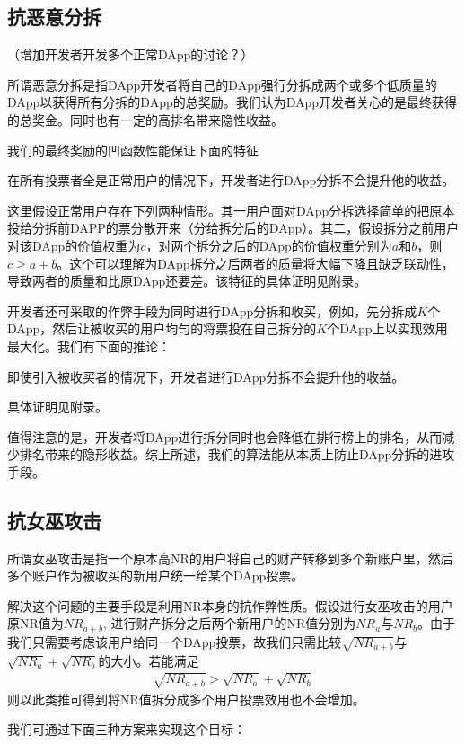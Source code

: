 \subsection{抗恶意分拆}
（增加开发者开发多个正常DApp的讨论？）

所谓恶意分拆是指DApp开发者将自己的DApp强行分拆成两个或多个低质量的DApp以获得所有分拆的DApp的总奖励。我们认为DApp开发者关心的是最终获得的总奖金。同时也有一定的高排名带来隐性收益。

我们的最终奖励的凹函数性能保证下面的特征
\begin{property}
	在所有投票者全是正常用户的情况下，开发者进行DApp分拆不会提升他的收益。
\end{property}
这里假设正常用户存在下列两种情形。其一用户面对DApp分拆选择简单的把原本投给分拆前DAPP的票分散开来（分给拆分后的DApp）。其二，假设拆分之前用户对该DApp的价值权重为$c$，对两个拆分之后的DApp的价值权重分别为$a$和$b$，则$c \geq a+b$。这个可以理解为DApp拆分之后两者的质量将大幅下降且缺乏联动性，导致两者的质量和比原DApp还要差。该特征的具体证明见附录。

开发者还可采取的作弊手段为同时进行DApp分拆和收买，例如，先分拆成$K$个DApp，然后让被收买的用户均匀的将票投在自己拆分的$K$个DApp上以实现效用最大化。我们有下面的推论：
\begin{corollary}
	即使引入被收买者的情况下，开发者进行DApp分拆不会提升他的收益。
\end{corollary}
具体证明见附录。

值得注意的是，开发者将DApp进行拆分同时也会降低在排行榜上的排名，从而减少排名带来的隐形收益。综上所述，我们的算法能从本质上防止DApp分拆的进攻手段。

\subsection{抗女巫攻击}
所谓女巫攻击是指一个原本高NR的用户将自己的财产转移到多个新账户里，然后多个账户作为被收买的新用户统一给某个DApp投票。

解决这个问题的主要手段是利用NR本身的抗作弊性质。假设进行女巫攻击的用户原NR值为$NR_{a+b}$, 进行财产拆分之后两个新用户的NR值分别为$NR_a$与$NR_b$。由于我们只需要考虑该用户给同一个DApp投票，故我们只需比较$\sqrt{NR_{a+b}}$与$\sqrt{NR_a}+\sqrt{NR_b}$的大小。若能满足
\begin{align}
\label{sybil}
\sqrt{NR_{a+b}}>\sqrt{NR_a}+\sqrt{NR_b}
\end{align}
则以此类推可得到将NR值拆分成多个用户投票效用也不会增加。

我们可通过下面三种方案来实现这个目标：

